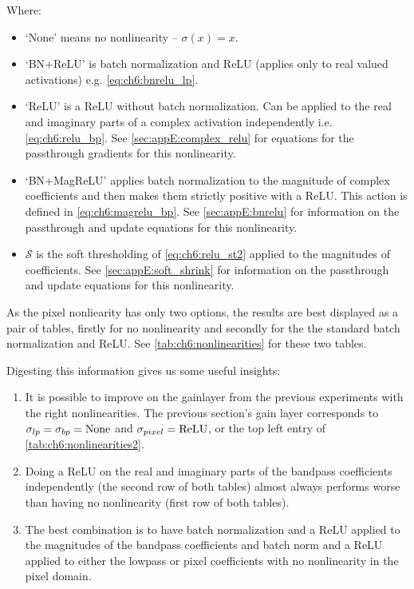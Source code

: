 Where:
\begin{itemize}
  \item `None' means no nonlinearity -- $\sigma(x) = x$.
  \item `BN+ReLU' is batch normalization and ReLU (applies only to real valued
    activations) e.g. \eqref{eq:ch6:bnrelu_lp}.
  \item `ReLU' is a ReLU without batch normalization. Can be applied to the real
    and imaginary parts of a complex activation independently i.e.
    \eqref{eq:ch6:relu_bp}. See \autoref{sec:appE:complex_relu} for equations
    for the passthrough gradients for this nonlinearity.
  \item `BN+MagReLU' applies batch normalization to the magnitude of complex
    coefficients and then makes them strictly positive with a ReLU. This action
    is defined in \eqref{eq:ch6:magrelu_bp}. See \autoref{sec:appE:bnrelu} for
    information on the passthrough and update equations for this nonlinearity.
  \item $\mathcal{S}$ is the soft thresholding of \eqref{eq:ch6:relu_st2}
    applied to the magnitudes of coefficients.  See
    \autoref{sec:appE:soft_shrink} for information on the passthrough and update
    equations for this nonlinearity.
\end{itemize}



As the pixel nonliearity has only two options, the results are best displayed as
a pair of tables, firstly for no nonlinearity and secondly for the
the standard batch normalization and ReLU. See
\autoref{tab:ch6:nonlinearities} for these two tables. 

Digesting this information gives us some useful insights: 
\begin{enumerate}
  \item It is possible to improve on the gainlayer from the previous experiments
    with the right nonlinearities. The previous section's gain layer corresponds
    to $\sigma_{lp} = \sigma_{bp} = \mathrm{None}$ and $\sigma_{pixel} = \mathrm{ReLU}$, or
    the top left entry of \autoref{tab:ch6:nonlinearities2}.
  \item Doing a ReLU on the real and imaginary parts of the bandpass
    coefficients independently (the second row of both tables) almost always
    performs worse than having no nonlinearity (first row of both tables).
  \item The best combination is to have batch normalization and a ReLU applied
    to the magnitudes of the bandpass coefficients and batch norm and a ReLU
    applied to either the lowpass or pixel coefficients with no nonlinearity in
    the pixel domain.
\end{enumerate}

